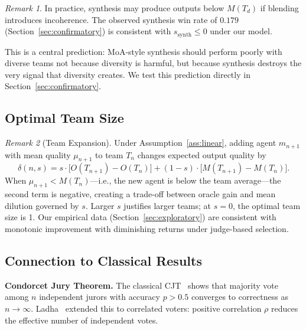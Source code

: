 \documentclass[10pt,twocolumn]{article}
\theoremstyle{remark}
\newtheorem{remark}{Remark}
\begin{document}
\begin{remark}
In practice, synthesis may produce outputs below $M(T_d)$ if blending introduces incoherence. The observed synthesis win rate of $0.179$ (Section~\ref{sec:confirmatory}) is consistent with $s_{\mathrm{synth}} \leq 0$ under our model.
\end{remark}

This is a central prediction: MoA-style synthesis should perform poorly with diverse teams not because diversity is harmful, but because synthesis destroys the very signal that diversity creates. We test this prediction directly in Section~\ref{sec:confirmatory}.

\subsection{Optimal Team Size}
\label{sec:teamsize}

\begin{remark}[Team Expansion]
\label{rem:teamsize}
Under Assumption~\ref{ass:linear}, adding agent $m_{n+1}$ with mean quality $\mu_{n+1}$ to team $T_n$ changes expected output quality by
\begin{equation}
\delta(n, s) = s \cdot \bigl[O(T_{n+1}) - O(T_n)\bigr] + (1-s) \cdot \bigl[M(T_{n+1}) - M(T_n)\bigr].
\label{eq:marginal}
\end{equation}
When $\mu_{n+1} < M(T_n)$---i.e., the new agent is below the team average---the second term is negative, creating a trade-off between oracle gain and mean dilution governed by $s$. Larger $s$ justifies larger teams; at $s = 0$, the optimal team size is 1. Our empirical data (Section~\ref{sec:exploratory}) are consistent with monotonic improvement with diminishing returns under judge-based selection.
\end{remark}

\subsection{Connection to Classical Results}
\label{sec:cjt}

\textbf{Condorcet Jury Theorem.}
The classical CJT~\cite{condorcet1785essai} shows that majority vote among $n$ independent jurors with accuracy $p > 0.5$ converges to correctness as $n \to \infty$. Ladha~\cite{ladha1992condorcet} extended this to correlated voters: positive correlation $\rho$ reduces the effective number of independent votes.
\end{document}
